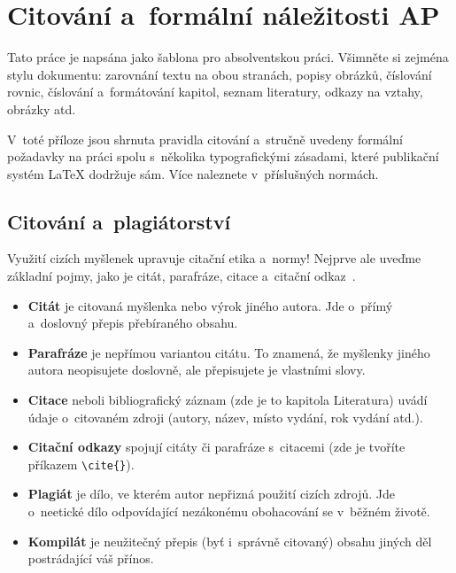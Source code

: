 ﻿\chapter{Citování a~formální náležitosti AP\label{ch:Manual_typo}}





Tato práce je napsána jako šablona pro absolventskou práci. Všimněte si zejména stylu dokumentu: zarovnání textu na obou stranách, popisy obrázků, číslování rovnic, číslování a~formátování kapitol, seznam literatury, odkazy na vztahy, obrázky atd.

V~toté příloze jsou shrnuta pravidla citování a~stručně uvedeny formální požadavky na práci spolu s~několika typografickými zásadami, které publikační systém \LaTeX\/ dodržuje sám. Více naleznete v~pří\-sluš\-ných normách. 



\section{Citování a~plagiátorství \label{se:Manual_cite}}

Využití cizích myšlenek upravuje citační etika a~normy! Nejprve ale uveďme základní pojmy, jako je citát, parafráze, citace a~citační odkaz~\cite{AbsolventThesis:FRANCIREK_AP}.
\begin{itemize}
    \item \textbf{Citát} je citovaná myšlenka nebo výrok jiného autora. Jde o~přímý a~doslovný přepis přebíraného obsahu.
    \item \textbf{Parafráze} je nepřímou variantou citátu. To znamená, že myšlenky jiného autora neopisujete doslovně, ale přepisujete je vlastními slovy.
    \item \textbf{Citace} neboli bibliografický záznam (zde je to kapitola Literatura) uvádí údaje o~citovaném zdroji (autory, název, místo vydání, rok vydání atd.).
    \item \textbf{Citační odkazy} spojují citáty či parafráze s~citacemi (zde je tvoříte příkazem \verb"\cite{}").
    \item \textbf{Plagiát} je dílo, ve kterém autor nepřizná použití cizích zdrojů. Jde o~neetické dílo odpovídající nezákonému obohacování se v~běžném životě.
    \item \textbf{Kompilát} je neužitečný přepis (byť i~správně citovaný) obsahu jiných děl po\-strá\-da\-jí\-cí váš přínos.
\end{itemize}


